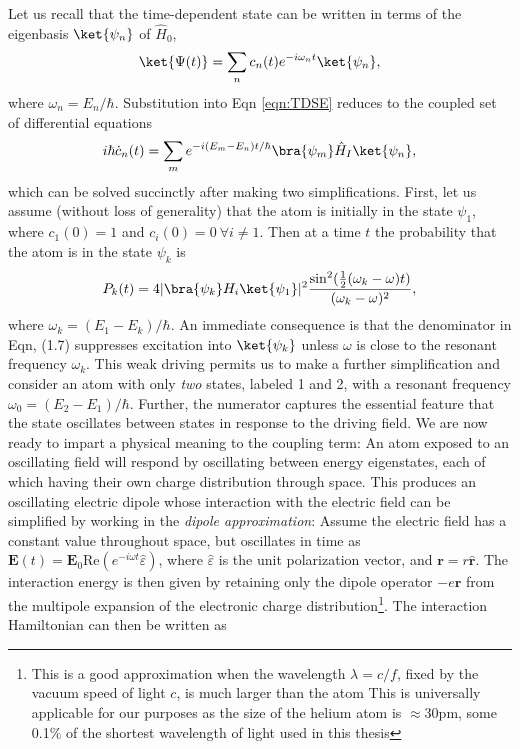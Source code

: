 	Let us recall that the time-dependent state can be written in terms of the eigenbasis $\ket{\psi_n}$ of $\hat{H}_0$,
	\begin{equation}
		\ket{\Psi(t)} = \sum_n c_n(t)e^{-i\omega_n t}\ket{\psi_n},
	\end{equation}
	where $\omega_n= E_n/\hbar$. Substitution into Eqn \ref{eqn:TDSE} reduces to the coupled set of differential equations 
	\begin{equation}
		i\hbar\dot{c}_n(t) = \sum_m e^{-i(E_m-E_n)t/\hbar}\bra{\psi_m}\hat{H}_I\ket{\psi_n},
	\end{equation} 
	which can be solved succinctly after making two simplifications. First, let us assume (without loss of generality) that the atom is initially in the state $\psi_1$, where $c_1(0)=1$ and $c_i(0)=0~\forall i\neq1$. Then at a time $t$ the probability that the atom is in the state $\psi_k$ is \cite{FootAtomic,BinneyBook}
	\begin{equation}
		P_k(t) = 4|\bra{\psi_k}H_i\ket{\psi_1}|^2 \frac{\sin^2(\frac{1}{2}(\omega_k-\omega)t)}{(\omega_k-\omega)^2},
	\end{equation}
	where $\omega_k = (E_1-E_k)/\hbar$. An immediate consequence is that the denominator in Eqn, (1.7) suppresses excitation into $\ket{\psi_k}$ unless $\omega$ is close to the resonant frequency $\omega_k$. This weak driving permits us to make a further simplification and consider an atom with only \emph{two} states, labeled 1 and 2, with a resonant frequency $\omega_0 =(E_2-E_1)/\hbar$. Further, the numerator captures the essential feature that the state oscillates between states in response to the driving field. We are now ready to impart a physical meaning to the coupling term: An atom exposed to an oscillating field will respond by oscillating between energy eigenstates, each of which having their own charge distribution through space. This produces an oscillating electric dipole whose interaction with the electric field can be simplified by working in the \emph{dipole approximation}: Assume the electric field has a constant value throughout space, but oscillates in time as $\textbf{E}(t) = \textbf{E}_0 \textrm{Re}(e^{-i\omega t}\hat{\varepsilon})$, where $\hat{\varepsilon}$ is the unit polarization vector, and $\textbf{r} = r\hat{\textbf{r}}$. The interaction energy is then given by retaining only the dipole operator $-e\textbf{r}$ from the multipole expansion of the electronic charge distribution\footnote{This is a good approximation when the wavelength $\lambda = c/f$, fixed by the vacuum speed of light $c$, is much larger than the atom This is universally applicable for our purposes as the size of the helium atom is $\approx 30$pm, some 0.1\% of the shortest wavelength of light used in this thesis}. The interaction Hamiltonian can then be written as
